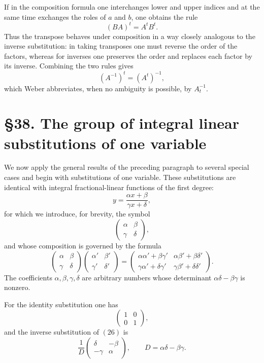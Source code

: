 \documentclass[11pt]{article}
\begin{document}
If in the composition formula one interchanges lower and upper indices and at the same time exchanges the roles of $a$ and $b$, one obtains the rule
\[
(BA)^{t} = A^{t}B^{t}.
\tag{24}
\]
Thus the transpose behaves under composition in a way closely analogous to the inverse substitution: in taking transposes one must reverse the order of the factors, whereas for inverses one preserves the order and replaces each factor by its inverse. Combining the two rules gives
\[
(A^{-1})^{t} = (A^{t})^{-1},
\tag{25}
\]
which Weber abbreviates, when no ambiguity is possible, by $A^{-1}_{t}$.

\section*{\S 38. The group of integral linear substitutions of one variable}

We now apply the general results of the preceding paragraph to several special cases and begin with substitutions of one variable. These substitutions are identical with integral fractional-linear functions of the first degree:
\[
y = \frac{\alpha x + \beta}{\gamma x + \delta},
\tag{26}
\]
for which we introduce, for brevity, the symbol
\[
\begin{pmatrix}
\alpha & \beta\\
\gamma & \delta
\end{pmatrix},
\tag{27}
\]
and whose composition is governed by the formula
\[
\begin{pmatrix}
\alpha & \beta\\
\gamma & \delta
\end{pmatrix}
\begin{pmatrix}
\alpha' & \beta'\\
\gamma' & \delta'
\end{pmatrix}
=
\begin{pmatrix}
\alpha\alpha' + \beta\gamma' & \alpha\beta' + \beta\delta'\\
\gamma\alpha' + \delta\gamma' & \gamma\beta' + \delta\delta'
\end{pmatrix}.
\tag{28}
\]
The coefficients $\alpha,\beta,\gamma,\delta$ are arbitrary numbers whose determinant $\alpha\delta-\beta\gamma$ is nonzero.

For the identity substitution one has
\[
\begin{pmatrix}
1 & 0\\
0 & 1
\end{pmatrix},
\tag{29}
\]
and the inverse substitution of \((26)\) is
\[
\frac{1}{D}
\begin{pmatrix}
\delta & -\beta\\
-\gamma & \alpha
\end{pmatrix},
\qquad D=\alpha\delta-\beta\gamma.
\tag{30}
\]
\end{document}
